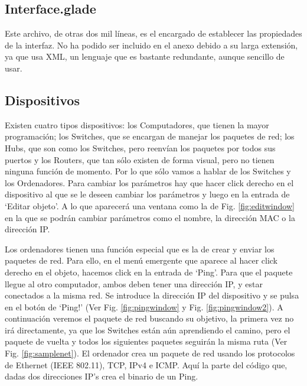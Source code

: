 \documentclass[a4paper, 11pt]{report} %
\begin{document}
\subsection{Interface.glade}
Este archivo, de otras dos mil líneas, es el encargado de establecer las propiedades de la interfaz. No ha podido ser incluido en el anexo debido a su larga extensión, ya que usa XML, un lenguaje que es bastante redundante, aunque sencillo de usar.

\subsection{Dispositivos}
Existen cuatro tipos dispositivos: los Computadores, que tienen la mayor programación; los Switches, que se encargan de manejar los paquetes de red; los Hubs, que son como los Switches, pero reenvían los paquetes por todos sus puertos y los Routers, que tan sólo existen de forma visual, pero no tienen ninguna función de momento. Por lo que sólo vamos a hablar de los Switches y los Ordenadores. Para cambiar los parámetros hay que hacer click derecho en el dispositivo al que se le deseen cambiar los parámetros y luego en la entrada de `Editar objeto'. A lo que aparecerá una ventana como la de Fig. \ref{fig:editwindow} en la que se podrán cambiar parámetros como el nombre, la dirección MAC o la dirección IP.

Los ordenadores tienen una función especial que es la de crear y enviar los paquetes de red. Para ello, en el menú emergente que aparece al hacer click derecho en el objeto, hacemos click en la entrada de `Ping'. Para que el paquete llegue al otro computador, ambos deben tener una dirección IP, y estar conectados a la misma red. Se introduce la dirección IP del dispositivo y se pulsa en el botón de `Ping!' (Ver Fig. \ref{fig:pingwindow} y Fig. \ref{fig:pingwindow2}). A continuación veremos el paquete de red buscando su objetivo, la primera vez no irá directamente, ya que los Switches están aún aprendiendo el camino, pero el paquete de vuelta y todos los siguientes paquetes seguirán la misma ruta (Ver Fig. \ref{fig:samplenet}). El ordenador crea un paquete de red usando los protocolos de Ethernet (IEEE 802.11), TCP, IPv4 e ICMP. Aquí la parte del código que, dadas dos direcciones IP's crea el binario de un Ping.

\inputminted[firstline=1782, lastline=1818, baselinestretch=1, fontsize=\scriptsize, linenos, breaklines]{python}{Codigo/Main.py}
\end{document}
